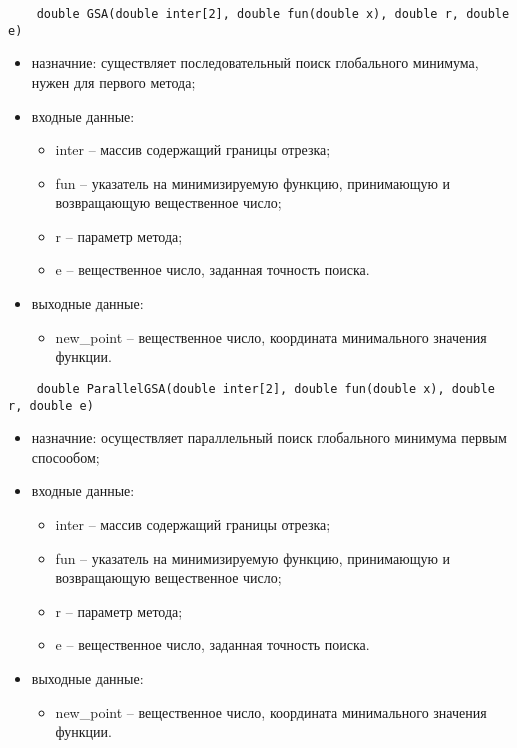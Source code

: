 \documentclass{report}
\begin{document}
\begin{lstlisting}
    double GSA(double inter[2], double fun(double x), double r, double e)
\end{lstlisting}
\begin{itemize}
    \item назначние: существляет последовательный поиск глобального минимума, нужен для первого метода;
    \item входные данные:
        \begin{itemize}	
            \item inter – массив содержащий границы отрезка;
            \item fun – указатель на минимизируемую функцию, принимающую и возвращающую вещественное число;
            \item r – параметр метода;
            \item e – вещественное число, заданная точность поиска.
        \end{itemize}
    \item выходные данные:
        \begin{itemize}
            \item new\_point – вещественное число, координата минимального значения функции.
        \end{itemize}
\end{itemize}

\begin{lstlisting}
    double ParallelGSA(double inter[2], double fun(double x), double r, double e)
\end{lstlisting}
\begin{itemize}
    \item назначние: осуществляет параллельный поиск глобального минимума первым спосообом;
    \item входные данные:
        \begin{itemize}	
            \item inter – массив содержащий границы отрезка;
            \item fun – указатель на минимизируемую функцию, принимающую и возвращающую вещественное число;
            \item r – параметр метода;
            \item e – вещественное число, заданная точность поиска.
        \end{itemize}
    \item выходные данные:
        \begin{itemize}
            \item new\_point – вещественное число, координата минимального значения функции.
        \end{itemize}
\end{itemize}
\end{document}
